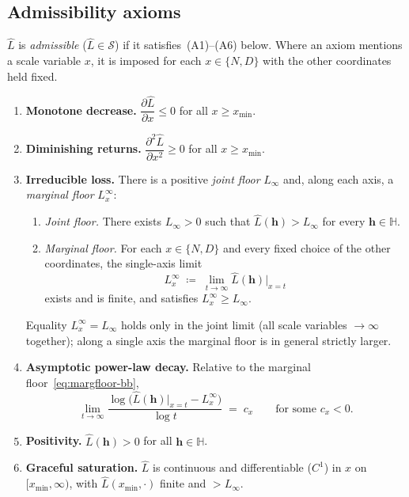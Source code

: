 \documentclass[11pt]{article}
\newcommand{\calS}{\mathcal{S}}
\newcommand{\bbH}{\mathbb{H}}
\newcommand{\Lhat}{\hat{L}}
\begin{document}
\subsection{Admissibility axioms}\label{sec:axioms}
$\Lhat$ is \emph{admissible} ($\Lhat \in \calS$) if it satisfies~(A1)--(A6) below.
Where an axiom mentions a scale variable $x$, it is imposed for each
$x \in \{N, D\}$ with the other coordinates held fixed.

\begin{enumerate}[nosep, leftmargin=2.2em, label=\textup{(A\arabic*)}]
    \item \textbf{Monotone decrease.}
    $\dfrac{\partial \Lhat}{\partial x} \leq 0$ for all $x \geq x_{\min}$.
    \item \textbf{Diminishing returns.}
    $\dfrac{\partial^2 \Lhat}{\partial x^2} \geq 0$ for all $x \geq x_{\min}$.
    \item \textbf{Irreducible loss.}
    There is a positive \emph{joint floor} $L_\infty$ and, along each axis, a
    \emph{marginal floor} $L^{\infty}_{x}$:
    \begin{enumerate}[nosep, leftmargin=1.4em, label=\textup{(\roman*)}]
        \item \emph{Joint floor.}
        There exists $L_\infty > 0$ such that
        $\Lhat(\mathbf{h}) > L_\infty$ for every $\mathbf{h} \in \bbH$.
        \item \emph{Marginal floor.}
        For each $x \in \{N,D\}$ and every fixed choice of the other
        coordinates, the single-axis limit
        \begin{equation}\label{eq:margfloor-bb}
            L^{\infty}_{x}
            \;\coloneqq\;
            \lim_{t \to \infty}
            \Lhat(\mathbf{h})\big|_{x = t}
        \end{equation}
        exists and is finite, and satisfies
        $L^{\infty}_{x} \geq L_\infty$.
    \end{enumerate}
    Equality $L^{\infty}_{x} = L_\infty$ holds only in the joint limit
    (all scale variables $\to \infty$ together); along a single axis the
    marginal floor is in general strictly larger.
    \item \textbf{Asymptotic power-law decay.}
    Relative to the marginal floor~\eqref{eq:margfloor-bb},
    \begin{equation}\label{eq:powerlaw-bb}
        \lim_{t\to\infty}
        \frac{\log\bigl(\Lhat(\mathbf{h})\big|_{x=t}
            - L^{\infty}_{x}\bigr)}{\log t}
        \;=\; c_x
        \qquad\text{for some } c_x < 0.
    \end{equation}
    \item \textbf{Positivity.}
    $\Lhat(\mathbf{h}) > 0$ for all $\mathbf{h} \in \bbH$.
    \item \textbf{Graceful saturation.}
    $\Lhat$ is continuous and differentiable ($C^1$) in $x$ on $[x_{\min}, \infty)$, with
    $\Lhat(x_{\min}, \cdot)$ finite and $> L_\infty$.
\end{enumerate}
\end{document}
